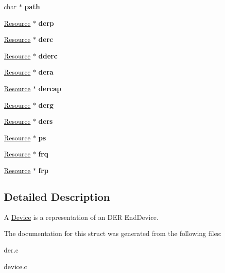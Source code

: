 \begin{DoxyCompactItemize}
\mbox{\label{structDevice_a5ffe83e93fb09927cac55bbb230ddf0d}} 
char $\ast$ {\bfseries path}
\item 
\mbox{\label{structDevice_a15523d1de382e1a72b6a354e032472d8}} 
\hyperlink{structResource}{Resource} $\ast$ {\bfseries derp}
\item 
\mbox{\label{structDevice_a1a6854d811e5b7fd438f7af53c75c0fe}} 
\hyperlink{structResource}{Resource} $\ast$ {\bfseries derc}
\item 
\mbox{\label{structDevice_a585cbfb645d7e76c1cc87e362b0b5cd2}} 
\hyperlink{structResource}{Resource} $\ast$ {\bfseries dderc}
\item 
\mbox{\label{structDevice_af5f0ad97ea408306dddc541bc25e3bc0}} 
\hyperlink{structResource}{Resource} $\ast$ {\bfseries dera}
\item 
\mbox{\label{structDevice_afb0dc99d24a0c6e09a645246691fde0b}} 
\hyperlink{structResource}{Resource} $\ast$ {\bfseries dercap}
\item 
\mbox{\label{structDevice_a34c3bf1ed3a44f2eeca53f35524e4341}} 
\hyperlink{structResource}{Resource} $\ast$ {\bfseries derg}
\item 
\mbox{\label{structDevice_af5d4a291b22a76b7bc7195250415a1de}} 
\hyperlink{structResource}{Resource} $\ast$ {\bfseries ders}
\item 
\mbox{\label{structDevice_ac1cd1b935d967f46b8e37f340248be84}} 
\hyperlink{structResource}{Resource} $\ast$ {\bfseries ps}
\item 
\mbox{\label{structDevice_ac01a66e40477bbdbcf06fae7287e1d07}} 
\hyperlink{structResource}{Resource} $\ast$ {\bfseries frq}
\item 
\mbox{\label{structDevice_a28a9800ab53619e2a5e44b6483fdba57}} 
\hyperlink{structResource}{Resource} $\ast$ {\bfseries frp}
\end{DoxyCompactItemize}


\subsection{Detailed Description}
A \hyperlink{structDevice}{Device} is a representation of an D\+ER End\+Device. 

The documentation for this struct was generated from the following files\+:\begin{DoxyCompactItemize}
\item 
der.\+c\item 
device.\+c\end{DoxyCompactItemize}
